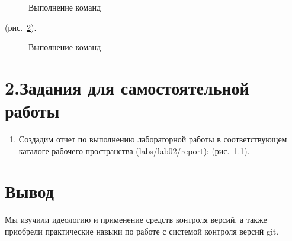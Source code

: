 \documentclass[
  english,
  russian,
  12pt,
  a4paper,
  DIV=11,
  numbers=noendperiod]{scrreprt}
\providecommand{\tightlist}{%
  \setlength{\itemsep}{0pt}\setlength{\parskip}{0pt}}
\begin{document}
\begin{figure}


\caption{\label{fig-012}Выполнение команд}

\end{figure}%

(рис.~\ref{fig-013}).

\begin{figure}


\caption{\label{fig-013}Выполнение команд}

\end{figure}%

\chapter{2.Задания для самостоятельной
работы}\label{ux437ux430ux434ux430ux43dux438ux44f-ux434ux43bux44f-ux441ux430ux43cux43eux441ux442ux43eux44fux442ux435ux43bux44cux43dux43eux439-ux440ux430ux431ux43eux442ux44b}

\begin{enumerate}
\def\labelenumi{\arabic{enumi}.}
\tightlist
\item
  Создадим отчет по выполнению лабораторной работы в соответствующем
  каталоге рабочего пространства (labs/lab02/report):
  (рис.~\ref{fig-014}).
\end{enumerate}

\begin{figure}


\caption{\label{fig-014}}

\end{figure}%

\chapter{Вывод}\label{ux432ux44bux432ux43eux434}

Мы изучили идеологию и применение средств контроля версий, а также
приобрели практические навыки по работе с системой контроля версий git.

\printbibliography[heading=none]
\end{document}
